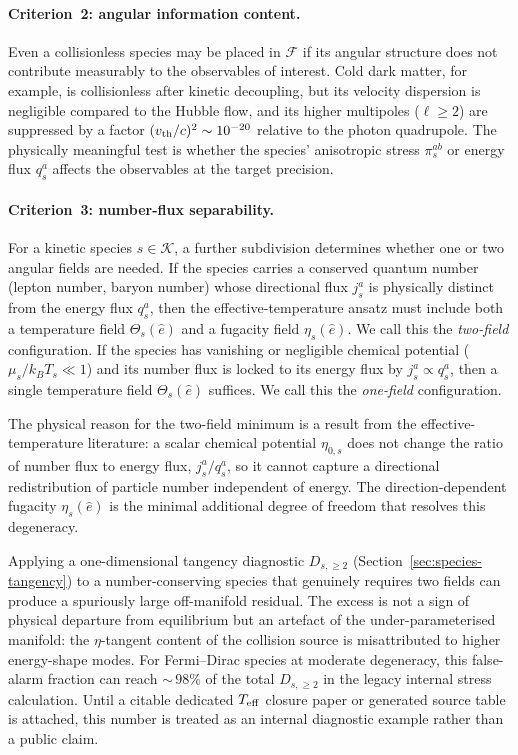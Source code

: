 \paragraph{Criterion~2: angular information content.}

Even a collisionless species may be placed in
$\mathcal{F}$ if its angular structure does not contribute
measurably to the observables of interest.  Cold dark
matter, for example, is collisionless after kinetic
decoupling, but its velocity dispersion is negligible
compared to the Hubble flow, and its higher multipoles
($\ell \geq 2$) are suppressed by a factor $(v_{\rm th}/c)^2
\sim 10^{-20}$ relative to the photon quadrupole.  The
physically meaningful test is whether the species'
anisotropic stress $\pi_s^{ab}$ or energy flux $q_s^a$
affects the observables at the target precision.


\paragraph{Criterion~3: number-flux separability.}

For a kinetic species $s \in \mathcal{K}$, a further
subdivision determines whether one or two angular fields are
needed.  If the species carries a conserved quantum number
(lepton number, baryon number) whose directional flux
$j_s^a$ is physically distinct from the energy flux $q_s^a$,
then the effective-temperature ansatz must include both a
temperature field $\Theta_s(\hat{e})$ and a fugacity field
$\eta_s(\hat{e})$.  We call this the \emph{two-field}
configuration.  If the species has vanishing or negligible
chemical potential ($\mu_s / k_B T_s \ll 1$) and its
number flux is locked to its energy flux by
$j_s^a \propto q_s^a$, then a single temperature field
$\Theta_s(\hat{e})$ suffices.  We call this the
\emph{one-field} configuration.

The physical reason for the two-field minimum is a result
from the effective-temperature literature: a scalar
chemical potential $\eta_{0,s}$ does not change the ratio
of number flux to energy flux,
$j_s^a / q_s^a$, so it cannot capture a directional
redistribution of particle number independent of energy.
The direction-dependent fugacity $\eta_s(\hat{e})$ is the
minimal additional degree of freedom that resolves this
degeneracy.

\begin{remark}
\label{rem:1d-pitfall}
Applying a one-dimensional tangency diagnostic
$D_{s,\geq 2}$ (Section~\ref{sec:species-tangency}) to a
number-conserving species that genuinely requires two
fields can produce a spuriously large off-manifold
residual.  The excess is not a sign of physical
departure from equilibrium but an artefact of the
under-parameterised manifold: the $\eta$-tangent content
of the collision source is misattributed to higher
energy-shape modes.  For Fermi--Dirac species at moderate
degeneracy, this false-alarm fraction can reach
${\sim}\,98\%$ of the total
$D_{s,\geq 2}$ in the legacy internal stress calculation.
Until a citable dedicated $T_{\mathrm{eff}}$ closure paper or generated
source table is attached, this number is treated as an internal
diagnostic example rather than a public claim.
\end{remark}


